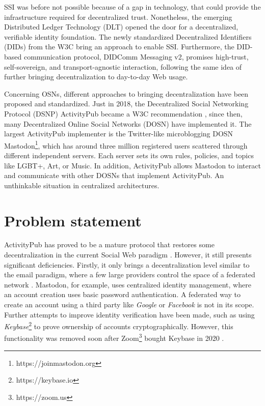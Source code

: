 SSI was before not possible because of a gap in technology, that could provide the infrastructure required for decentralized trust. Nonetheless, the emerging Distributed Ledger Technology (DLT) opened the door for a decentralized, verifiable identity foundation. The newly standardized Decentralized Identifiers (DIDs) from the W3C bring an approach to enable SSI. Furthermore, the DID-based communication protocol, DIDComm Messaging v2, promises high-trust, self-sovereign, and transport-agnostic interaction, following the same idea of further bringing decentralization to day-to-day Web usage.

Concerning OSNs, different approaches to bringing decentralization have been proposed and standardized. Just in 2018, the Decentralized Social Networking Protocol (DSNP) ActivityPub became a W3C recommendation \cite{lemmer-webber_tallon_guy_prodromou_2018}, since then, many Decentralized Online Social Networks (DOSN) have implemented it. The largest ActivityPub implementer is the Twitter-like microblogging DOSN Mastodon\footnote{https://joinmastodon.org}, which has around three million registered users scattered through different independent servers. Each server sets its own rules, policies, and topics like LGBT+, Art, or Music. In addition, ActivityPub allows Mastodon to interact and communicate with other DOSNs that implement ActivityPub. An unthinkable situation in centralized architectures. 


\section{Problem statement}
 
 ActivityPub has proved to be a mature protocol that restores some decentralization in the current Social Web paradigm \cite{webber_sporny_2017}.  However, it still presents significant deficiencies. Firstly, it only brings a decentralization level similar to the email paradigm, where a few large providers control the space of a federated network \cite{webber_sporny_2017}. Mastodon, for example, uses centralized identity management, where an account creation uses basic password authentication. A federated way to create an account using a third party like \emph{Google} or \emph{Facebook} is not in its scope. Further attempts to improve identity verification have been made, such as using \emph{Keybase}\footnote{https://keybase.io} to prove ownership of accounts cryptographically. However, this functionality was removed soon after Zoom\footnote{https://zoom.us} bought Keybase in 2020 \cite{rochko_2021}. 

